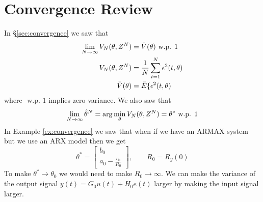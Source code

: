 
\mainmatter
\setcounter{page}{1}

\lectureseries[\course]{\course}

\date{November 12, 2009}

\setaddress

\setcounter{lecture}{13}
\setcounter{chapter}{13}


\section{Convergence Review}
In \S\ref{sec:convergence} we saw that
\begin{align*}
\lim_{N\to\infty}V_N(\theta,Z^N) &= \bar{V}(\theta) \text{ w.p. } 1 \\
V_N(\theta,Z^N) &= \frac{1}{N}\sum_{t=1}^N\epsilon^2(t,\theta) \\
\bar{V}(\theta) &= \bar{E}\{\epsilon^2(t,\theta)
\end{align*}
where $\text{ w.p. } 1$ implies zero variance. We also saw that
$$\lim_{N\to\infty}\hat{\theta}^N = \arg\min_\theta V_N(\theta,Z^N) = \theta^\ast \text{ w.p. } 1$$
In Example \ref{ex:convergence} we saw that when if we have an ARMAX system but we use an ARX model then we get
$$\theta^\ast = \left[\begin{array}{c} b_0 \\ a_0-\frac{c_0}{R_0} \end{array}\right], \qquad R_0=R_y(0)$$
To make $\theta^\ast\to\theta_0$ we would need to make $R_0\to\infty$. We can make the variance of the output signal $y(t)=G_0u(t)+H_0e(t)$ larger by making the input signal larger.

